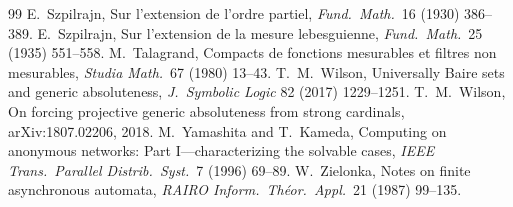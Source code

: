 \documentclass[11pt]{article}
\theoremstyle{definition}
\theoremstyle{remark}
\begin{document}
\begin{thebibliography}{99}
 E.~Szpilrajn, Sur l'extension de l'ordre partiel, \emph{Fund.\ Math.}\ 16 (1930) 386--389.
 E.~Szpilrajn, Sur l'extension de la mesure lebesguienne, \emph{Fund.\ Math.}\ 25 (1935) 551--558.
 M.~Talagrand, Compacts de fonctions mesurables et filtres non mesurables, \emph{Studia Math.}\ 67 (1980) 13--43.
 T.~M.~Wilson, Universally Baire sets and generic absoluteness, \emph{J.\ Symbolic Logic} 82 (2017) 1229--1251.
 T.~M.~Wilson, On forcing projective generic absoluteness from strong cardinals, arXiv:1807.02206, 2018.
 M.~Yamashita and T.~Kameda, Computing on anonymous networks: Part I---characterizing the solvable cases, \emph{IEEE Trans.\ Parallel Distrib.\ Syst.}\ 7 (1996) 69--89.
 W.~Zielonka, Notes on finite asynchronous automata, \emph{RAIRO Inform.\ Th\'eor.\ Appl.}\ 21 (1987) 99--135.
\end{thebibliography}
\end{document}
